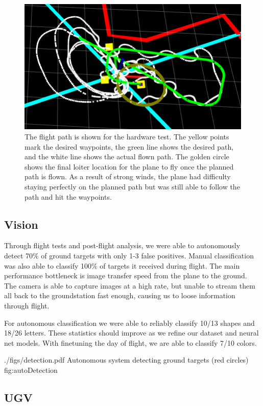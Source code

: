 \documentclass[]{auvsi_doc}
\begin{document}
\begin{figure}
    \centering
    \includegraphics[width=.75\textwidth]{WaypointTest.png}
    \caption{The flight path is shown for the hardware test. The yellow points mark the desired waypoints, the green line shows the desired path, and the white line shows the actual flown path. The golden circle shows the final loiter location for the plane to fly once the planned path is flown. As a result of strong winds, the plane had difficulty staying perfectly on the planned path but was still able to follow the path and hit the waypoints.}
    \label{fig:flight}
\end{figure}

\subsection{Vision}

Through flight tests and post-flight analysis, we were able to autonomously detect 70\% of ground targets with only 1-3 false positives. Manual classification was also able to classify 100\% of targets it received during flight. The main performance bottleneck is image transfer speed from the plane to the ground. The camera is able to capture images at a high rate, but unable to stream them all back to the groundstation fast enough, causing us to loose information through flight.

For autonomous classification we were able to reliably classify 10/13 shapes and 18/26 letters. These statistics should improve as we refine our dataset and neural net models. With finetuning the day of flight, we are able to classify 7/10 colors.

\AUVSIFigure
{./figs/detection.pdf}
{\textwidth}
{Autonomous system detecting ground targets (red circles)}
{fig:autoDetection}

\subsection{UGV}
\end{document}
